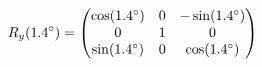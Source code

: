 \documentclass[preview]{standalone}
\begin{document}
\begin{align*}
\special{dvisvgm:raw <g id='unique000'>}R_y(1.4^\circ) = \begin{pmatrix} \cos(1.4^\circ) & 0 & -\sin(1.4^\circ) \\ 0 & 1 & 0 \\ \sin(1.4^\circ) & 0 & \cos(1.4^\circ) \end{pmatrix}\special{dvisvgm:raw </g>}
\end{align*}
\end{document}
